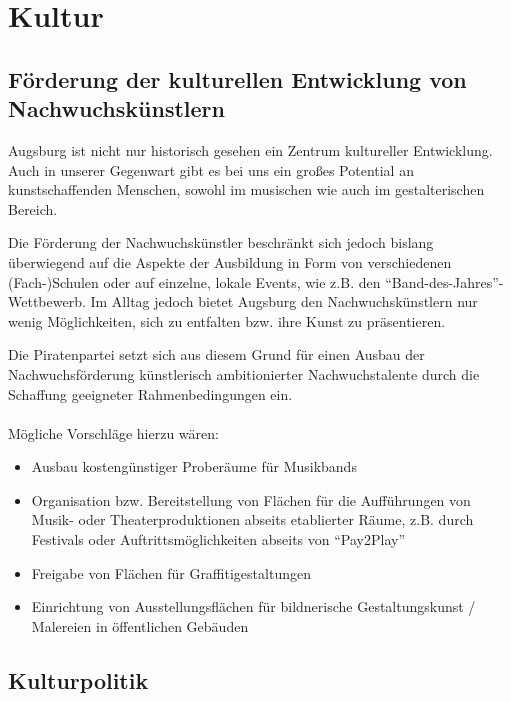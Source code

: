\chapter{Kultur}
  
  \section{Förderung der kulturellen Entwicklung von Nachwuchskünstlern}
  Augsburg ist nicht nur historisch gesehen ein Zentrum kultureller 
  Entwicklung. Auch in unserer Gegenwart gibt es bei uns ein großes Potential 
  an kunstschaffenden Menschen, sowohl im musischen wie auch im 
  gestalterischen Bereich.
  
  Die Förderung der Nachwuchskünstler beschränkt sich jedoch bislang 
  überwiegend auf die Aspekte der Ausbildung in Form von verschiedenen 
  (Fach-)Schulen oder auf einzelne, lokale Events, wie z.B. den 
  "`Band-des-Jahres"'-Wettbewerb. Im Alltag jedoch bietet Augsburg den 
  Nachwuchskünstlern nur wenig Möglichkeiten, sich zu entfalten bzw. ihre 
  Kunst zu präsentieren.
  
  Die Piratenpartei setzt sich aus diesem Grund für einen Ausbau der 
  Nachwuchsförderung künstlerisch ambitionierter Nachwuchstalente durch die 
  Schaffung geeigneter Rahmenbedingungen ein.\\
  \\
  Mögliche Vorschläge hierzu wären:
  
  \begin{itemize}
    \item Ausbau kostengünstiger Proberäume für Musikbands
    \item Organisation bzw. Bereitstellung von Flächen für die Aufführungen
          von Musik- oder Theaterproduktionen abseits etablierter Räume, z.B. 
          durch Festivals oder Auftrittsmöglichkeiten abseits von "`Pay2Play"'
    \item Freigabe von Flächen für Graffitigestaltungen
    \item Einrichtung von Ausstellungsflächen für bildnerische 
          Gestaltungskunst / Malereien in öffentlichen Gebäuden 
  \end{itemize}
  
  \section{Kulturpolitik}
